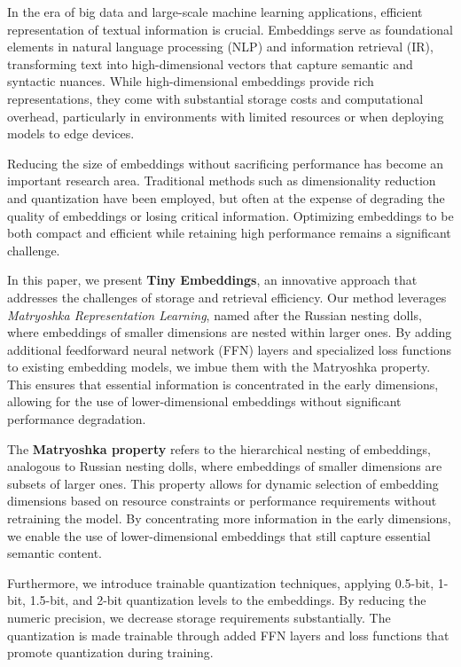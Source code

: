 \documentclass[acmtog, authorversion]{acmart}
\begin{document}
In the era of big data and large-scale machine learning applications, efficient representation of textual information is crucial. Embeddings serve as foundational elements in natural language processing (NLP) and information retrieval (IR), transforming text into high-dimensional vectors that capture semantic and syntactic nuances. While high-dimensional embeddings provide rich representations, they come with substantial storage costs and computational overhead, particularly in environments with limited resources or when deploying models to edge devices.  
  
Reducing the size of embeddings without sacrificing performance has become an important research area. Traditional methods such as dimensionality reduction and quantization have been employed, but often at the expense of degrading the quality of embeddings or losing critical information. Optimizing embeddings to be both compact and efficient while retaining high performance remains a significant challenge.  
  
In this paper, we present \textbf{Tiny Embeddings}, an innovative approach that addresses the challenges of storage and retrieval efficiency. Our method leverages \textit{Matryoshka Representation Learning}, named after the Russian nesting dolls, where embeddings of smaller dimensions are nested within larger ones. By adding additional feedforward neural network (FFN) layers and specialized loss functions to existing embedding models, we imbue them with the Matryoshka property. This ensures that essential information is concentrated in the early dimensions, allowing for the use of lower-dimensional embeddings without significant performance degradation.  
  
The \textbf{Matryoshka property} refers to the hierarchical nesting of embeddings, analogous to Russian nesting dolls, where embeddings of smaller dimensions are subsets of larger ones. This property allows for dynamic selection of embedding dimensions based on resource constraints or performance requirements without retraining the model. By concentrating more information in the early dimensions, we enable the use of lower-dimensional embeddings that still capture essential semantic content.  

Furthermore, we introduce trainable quantization techniques, applying 0.5-bit, 1-bit, 1.5-bit, and 2-bit quantization levels to the embeddings. By reducing the numeric precision, we decrease storage requirements substantially. The quantization is made trainable through added FFN layers and loss functions that promote quantization during training.  
  
\end{document}
